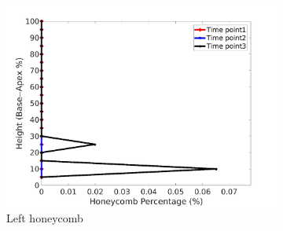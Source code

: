 \begin{figure}[H]
\begin{subfigure}{.42\linewidth}
  \includegraphics[width=\linewidth,trim={{.0\wd0} {.0\wd0} {.0\wd0} {.0\wd0}},clip]{Appendix/Image_AppexA/BaseToApex/IPF6LeftLungHoneycombDiseaseAgainstHeight.jpg} %
  \caption{Left honeycomb}
  \label{fig:IPF6DiseaseAgainstHeight-e} 
\end{subfigure} 
\begin{subfigure}{.42\linewidth}%

\end{subfigure}
\end{figure}
